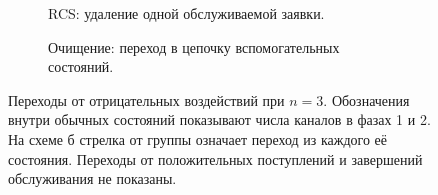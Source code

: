 \begin{figure}[!htbp]
\centering
\begin{subfigure}[t]{0.98\linewidth}
\centering
{}
\caption{RCS: удаление одной обслуживаемой заявки.}
\label{fig:rcs_transitions}
\end{subfigure}

\begin{subfigure}[t]{0.98\linewidth}
\centering
{}
\caption{Очищение: переход в цепочку вспомогательных состояний.}
\label{fig:disaster_transitions}
\end{subfigure}
\caption{Переходы от отрицательных воздействий при \(n=3\). Обозначения внутри обычных состояний показывают числа каналов в фазах 1 и 2. На схеме б стрелка от группы означает переход из каждого её состояния. Переходы от положительных поступлений и завершений обслуживания не показаны.}
\label{fig:negative_transitions}
\end{figure}

